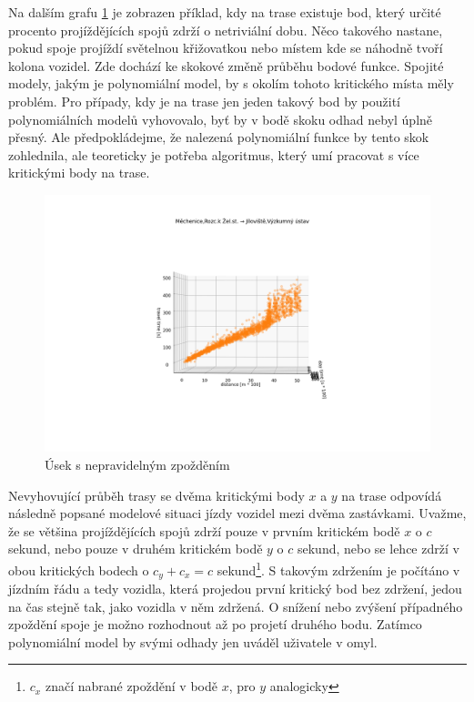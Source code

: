 Na dalším grafu \ref{fig:nepredvidatelne_zdrzeni} je zobrazen příklad, kdy na trase existuje bod, který určité procento projíždějících spojů zdrží o netriviální dobu. Něco takového nastane, pokud spoje projíždí světelnou křižovatkou nebo místem kde se náhodně tvoří kolona vozidel. Zde dochází ke skokové změně průběhu bodové funkce. Spojité modely, jakým je polynomiální model, by s okolím tohoto kritického místa měly problém. Pro případy, kdy je na trase jen jeden takový bod by použití polynomiálních modelů vyhovovalo, byť by v bodě skoku odhad nebyl úplně přesný. Ale předpokládejme, že nalezená polynomiální funkce by tento skok zohlednila, ale teoreticky je potřeba algoritmus, který umí pracovat s více kritickými body na trase.


\begin{figure}
\centering
  \includegraphics[width=\linewidth]{../img/nepredvidatelne_zdrzeni.png}
  \caption{Úsek s nepravidelným zpožděním}
  \label{fig:nepredvidatelne_zdrzeni}
\end{figure}


\bigbreak


Nevyhovující průběh trasy se dvěma kritickými body $x$ a $y$ na trase odpovídá následně popsané modelové situaci jízdy vozidel mezi dvěma zastávkami. Uvažme, že se většina projíždějících spojů zdrží pouze v prvním kritickém bodě $x$ o $c$ sekund, nebo pouze v druhém kritickém bodě $y$ o $c$ sekund, nebo se lehce zdrží v obou kritických bodech o $c_y + c_x = c$ sekund\footnote{$c_x$ značí nabrané zpoždění v bodě $x$, pro $y$ analogicky}. S takovým zdržením je počítáno v jízdním řádu a tedy vozidla, která projedou první kritický bod bez zdržení, jedou na čas stejně tak, jako vozidla v něm zdržená. O snížení nebo zvýšení případného zpoždění spoje je možno rozhodnout až po projetí druhého bodu. Zatímco polynomiální model by svými odhady jen uváděl uživatele v omyl.


